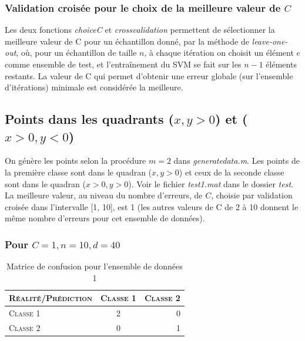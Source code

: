 \documentclass{article}
\begin{document}
\subsubsection{Validation croisée pour le choix de la meilleure valeur de $C$}

Les deux fonctions \emph{choiceC} et \emph{crossvalidation} permettent de sélectionner la meilleure valeur de C pour un échantillon donné, par la méthode de \emph{leave-one-out}, où, pour un échantillon de taille $n$, à chaque itération on choisit un élément $e$ comme ensemble de test, et l'entraînement du SVM se fait sur les $n-1$ éléments restants. La valeur de C qui permet d'obtenir une erreur globale (sur l'ensemble d'itérations) minimale est considérée la meilleure.

\subsection{Points dans les quadrants ($x, y > 0$) et ($x > 0, y < 0$)}

On génère les points selon la procédure $m = 2$ dans \emph{generatedata.m}. Les points de la première classe sont dans le quadran ($x, y > 0$) et ceux de la seconde classe sont dans le quadran ($x > 0, y > 0$). Voir le fichier \emph{test1.mat} dans le dossier \emph{test}. La meilleure valeur, au niveau du nombre d'erreurs, de $C$, choisie par validation croisée dans l'intervalle [1, 10], est 1 (les autres valeurs de C de 2 à 10 donnent le même nombre d'erreurs pour cet ensemble de données).

\subsubsection{Pour $C=1, n=10, d=40$}

     \begin{table}[H]
       \caption{Matrice de confusion pour l'ensemble de données 1}
       \begin{tabular}{|l|c|r|}
         \hline
         \textsc{Réalité/Prédiction} & \textsc{Classe 1} & \textsc{Classe 2}\\
         \hline
         \textsc{Classe 1} & 2 & 0\\
         \hline
         \textsc{Classe 2} & 0 & 1\\
         \hline
       \end{tabular}
     \end{table}
\end{document}
